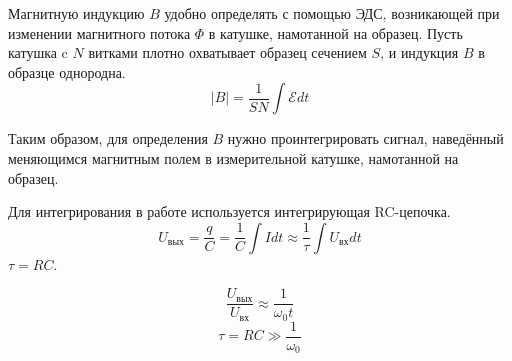  Магнитную индукцию $B$ удобно определять с помощью ЭДС, возникающей при изменении магнитного
 потока $\Phi$ в катушке, намотанной на образец. Пусть катушка c $N$ 
  витками плотно охватывает образец сечением $S$, и индукция $B$ в образце
  однородна.
  \[
      |B| = \frac{1}{SN}\int\mathcal{E}dt
  \]
 
  Таким образом, для определения $B$ нужно проинтегрировать сигнал,
  наведённый меняющимся магнитным полем в измерительной катушке,
  намотанной на образец.

  Для интегрирования в работе используется интегрирующая RC-цепочка.
\[
    U_{\text{вых}} = \frac{q}{C} = \frac{1}{C}\int Idt\approx \frac{1}{\tau}\int U_{\text{вх}}dt
\]
$\tau = RC$.

\[
    \frac{U_{\text{вых}}}{U_{\text{вх}}}\approx \frac{1}{\omega_{0}t}
\]
\[
    \tau = RC \gg \frac{1}{\omega_{0}}
\]


